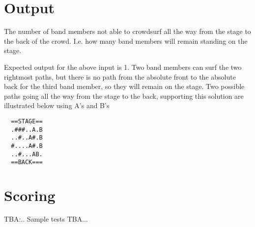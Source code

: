 \section*{Output}

The number of band members not able to crowdsurf all the way from the stage to the back of the crowd. I.e. how many band members will remain standing on the stage.

Expected output for the above input is 1. Two band members can surf the two rightmost paths, but there is no path from the absolute front to the absolute back for the third band member, so they will remain on the stage.
Two possible paths going all the way from the stage to the back, supporting this solution are illustrated below using A's and B's

\begin{verbatim}
  ==STAGE==
  .###..A.B
  ..#..A#.B
  #....A#.B
  ..#...AB.
  ==BACK===
  \end{verbatim}

\section*{Scoring}

TBA:..
Sample tests TBA...
